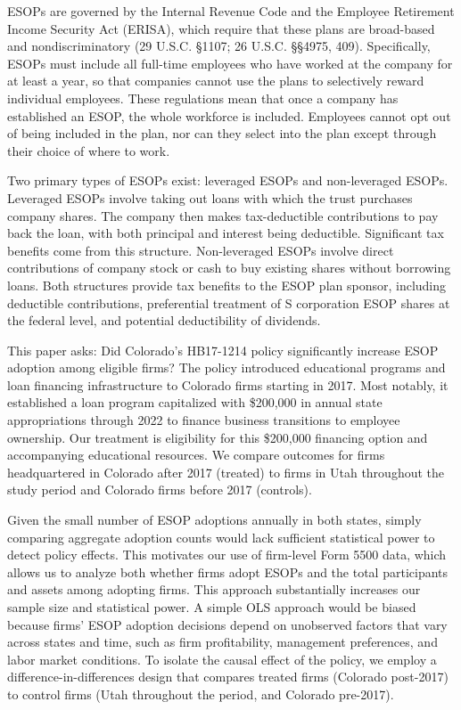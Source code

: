 \documentclass[12pt]{article}
\begin{document}
ESOPs are governed by the Internal Revenue Code and the Employee Retirement Income Security Act (ERISA), which require that these plans are broad-based and nondiscriminatory (29 U.S.C. \S 1107; 26 U.S.C. \S\S 4975, 409). Specifically, ESOPs must include all full-time employees who have worked at the company for at least a year, so that companies cannot use the plans to selectively reward individual employees. These regulations mean that once a company has established an ESOP, the whole workforce is included. Employees cannot opt out of being included in the plan, nor can they select into the plan except through their choice of where to work.

Two primary types of ESOPs exist: leveraged ESOPs and non-leveraged ESOPs. Leveraged ESOPs involve taking out loans with which the trust purchases company shares. The company then makes tax-deductible contributions to pay back the loan, with both principal and interest being deductible. Significant tax benefits come from this structure. Non-leveraged ESOPs involve direct contributions of company stock or cash to buy existing shares without borrowing loans. Both structures provide tax benefits to the ESOP plan sponsor, including deductible contributions, preferential treatment of S corporation ESOP shares at the federal level, and potential deductibility of dividends.

This paper asks: Did Colorado's HB17-1214 policy significantly increase ESOP adoption among eligible firms?  The policy introduced educational programs and loan financing infrastructure to Colorado firms starting in 2017. Most notably, it established a loan program capitalized with \$200,000 in annual state appropriations through 2022 to finance business transitions to employee ownership. Our treatment is eligibility for this \$200,000 financing option and accompanying educational resources. We compare outcomes for firms headquartered in Colorado after 2017 (treated) to firms in Utah throughout the study period and Colorado firms before 2017 (controls). 

Given the small number of ESOP adoptions annually in both states, simply comparing aggregate adoption counts would lack sufficient statistical power to detect policy effects. This motivates our use of firm-level Form 5500 data, which allows us to analyze both whether firms adopt ESOPs and the total participants and assets among adopting firms. This approach substantially increases our sample size and statistical power. A simple OLS approach would be biased because firms' ESOP adoption decisions depend on unobserved factors that vary across states and time, such as firm profitability, management preferences, and labor market conditions. To isolate the causal effect of the policy, we employ a difference-in-differences design that compares treated firms (Colorado post-2017) to control firms (Utah throughout the period, and Colorado pre-2017).
\end{document}
